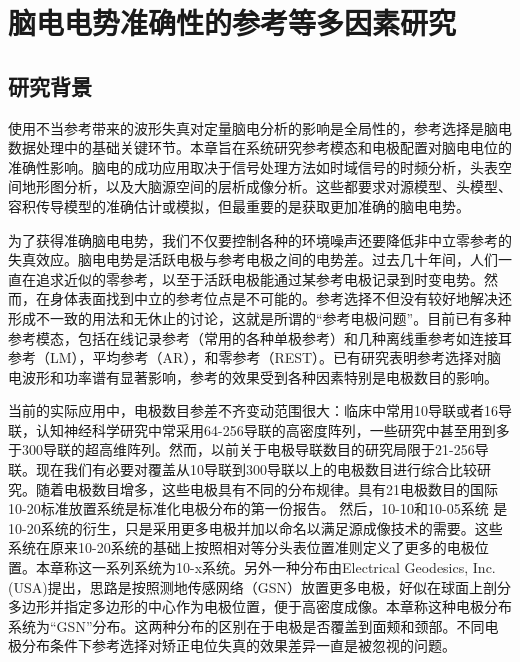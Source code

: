\chapter{脑电电势准确性的参考等多因素研究}
\section{研究背景}
使用不当参考带来的波形失真对定量脑电分析的影响是全局性的，参考选择是脑电数据处理中的基础关键环节。本章旨在系统研究参考模态和电极配置对脑电电位的准确性影响。脑电的成功应用取决于信号处理方法如时域信号的时频分析，头表空间地形图分析，以及大脑源空间的层析成像分析。这些都要求对源模型、头模型、容积传导模型的准确估计或模拟，但最重要的是获取更加准确的脑电电势。

为了获得准确脑电电势，我们不仅要控制各种的环境噪声还要降低非中立零参考的失真效应。脑电电势是活跃电极与参考电极之间的电势差。过去几十年间，人们一直在追求近似的零参考，以至于活跃电极能通过某参考电极记录到时变电势。然而，在身体表面找到中立的参考位点是不可能的。参考选择不但没有较好地解决还形成不一致的用法和无休止的讨论，这就是所谓的“参考电极问题”。目前已有多种参考模态，包括在线记录参考（常用的各种单极参考）和几种离线重参考如连接耳参考（LM），平均参考（AR），和零参考（REST）。已有研究表明参考选择对脑电波形和功率谱有显著影响，参考的效果受到各种因素特别是电极数目的影响。

当前的实际应用中，电极数目参差不齐变动范围很大：临床中常用10导联或者16导联，认知神经科学研究中常采用64-256导联的高密度阵列，一些研究中甚至用到多于300导联的超高维阵列。然而，以前关于电极导联数目的研究局限于21-256导联。现在我们有必要对覆盖从10导联到300导联以上的电极数目进行综合比较研究。随着电极数目增多，这些电极具有不同的分布规律。具有21电极数目的国际10-20标准放置系统是标准化电极分布的第一份报告。 然后，10-10和10-05系统
是10-20系统的衍生，只是采用更多电极并加以命名以满足源成像技术的需要。这些系统在原来10-20系统的基础上按照相对等分头表位置准则定义了更多的电极位置。本章称这一系列系统为10-x系统。另外一种分布由Electrical Geodesics, Inc.(USA)提出，思路是按照测地传感网络（GSN）放置更多电极，好似在球面上剖分多边形并指定多边形的中心作为电极位置，便于高密度成像。本章称这种电极分布系统为“GSN”分布。这两种分布的区别在于电极是否覆盖到面颊和颈部。不同电极分布条件下参考选择对矫正电位失真的效果差异一直是被忽视的问题。

